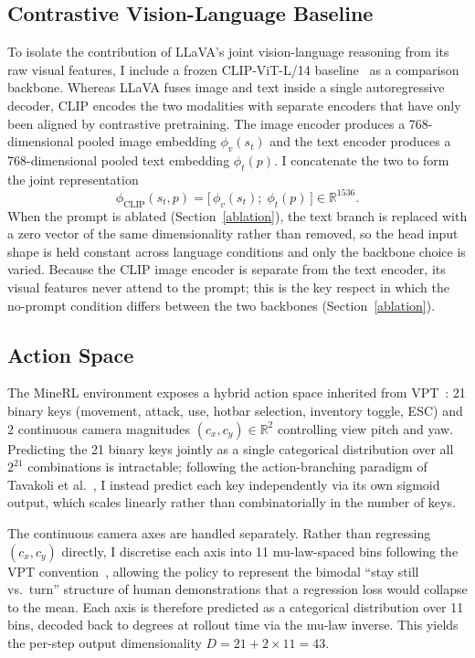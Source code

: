 \subsection{Contrastive Vision-Language Baseline} \label{sec:clip_baseline}
To isolate the contribution of LLaVA's joint vision-language reasoning from
its raw visual features, I include a frozen CLIP-ViT-L/14
baseline~\cite{radford2021clip} as a comparison backbone. Whereas LLaVA fuses
image and text inside a single autoregressive decoder, CLIP encodes the two
modalities with separate encoders that have only been aligned by contrastive
pretraining. The image encoder produces a 768-dimensional pooled image
embedding $\phi_v(s_t)$ and the text encoder produces a 768-dimensional
pooled text embedding $\phi_t(p)$. I concatenate the two to form the joint
representation
\begin{equation}
    \phi_{\mathrm{CLIP}}(s_t, p) = \bigl[\,\phi_v(s_t);\; \phi_t(p)\,\bigr] \in \mathbb{R}^{1536}.
\end{equation}
When the prompt is ablated (Section~\ref{ablation}), the text branch is
replaced with a zero vector of the same dimensionality rather than removed,
so the head input shape is held constant across language conditions and only
the backbone choice is varied. Because the CLIP image encoder is separate
from the text encoder, its visual features never attend to the prompt; this
is the key respect in which the no-prompt condition differs between the two
backbones (Section~\ref{ablation}).

\subsection{Action Space} \label{action_space}
The MineRL environment exposes a hybrid action space inherited from
VPT~\cite{baker2022vpt}: 21 binary keys (movement, attack, use, hotbar
selection, inventory toggle, ESC) and 2 continuous camera magnitudes
$(c_x, c_y) \in \mathbb{R}^2$ controlling view pitch and yaw. Predicting the
21 binary keys jointly as a single categorical distribution over all $2^{21}$
combinations is intractable; following the action-branching paradigm of
Tavakoli et al.~\cite{tavakoli2018actionbranching}, I instead predict each
key independently via its own sigmoid output, which scales linearly rather
than combinatorially in the number of keys.

The continuous camera axes are handled separately. Rather than regressing
$(c_x, c_y)$ directly, I discretise each axis into 11 mu-law-spaced bins
following the VPT convention~\cite{baker2022vpt}, allowing the policy to
represent the bimodal \enquote{stay still vs.\ turn} structure of human
demonstrations that a regression loss would collapse to the mean. Each axis
is therefore predicted as a categorical distribution over 11 bins, decoded
back to degrees at rollout time via the mu-law inverse. This yields the
per-step output dimensionality $D = 21 + 2 \times 11 = 43$.

